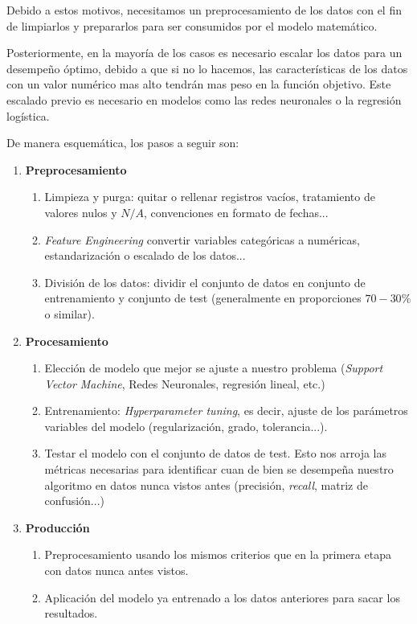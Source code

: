 Debido a estos motivos, necesitamos un preprocesamiento de los datos con el fin de limpiarlos y 
prepararlos para ser consumidos por el modelo matemático.

Posteriormente, en la mayoría de los casos es necesario escalar los datos para un desempeño óptimo, 
debido a que si no lo hacemos, las características de los datos con un valor numérico mas alto 
tendrán mas peso en la función objetivo. Este escalado previo es necesario en modelos como 
las redes neuronales o la regresión logística.

\clearpage

\noindent De manera esquemática, los pasos a seguir son:
\begin{framed}
\begin{enumerate}
  \item \textbf{Preprocesamiento}
  \begin{enumerate}
    \item Limpieza y purga: quitar o rellenar registros vacíos, tratamiento de valores nulos 
          y $N/A$, convenciones en formato de fechas...
    \item \textit{Feature Engineering} convertir variables categóricas a numéricas, 
          estandarización o escalado de los datos...
    \item División de los datos: dividir el conjunto de datos en conjunto de entrenamiento y 
          conjunto de test (generalmente en proporciones $70 - 30\%$ o similar).
  \end{enumerate}
  
  \item \textbf{Procesamiento}
  \begin{enumerate}
    \item Elección de modelo que mejor se ajuste a nuestro problema 
          (\textit{Support Vector Machine}, Redes Neuronales, regresión lineal, etc.)
    \item Entrenamiento: \textit{Hyperparameter tuning}, 
          es decir, ajuste de los parámetros variables del modelo (regularización, grado, tolerancia...).
    \item Testar el modelo con el conjunto de datos de test. Esto nos arroja las métricas necesarias
    para identificar cuan de bien se desempeña nuestro algoritmo en datos nunca vistos antes 
    (precisión, \textit{recall}, matriz de confusión...)
  \end{enumerate}
  
  \item \textbf{Producción}
  \begin{enumerate}
    \item Preprocesamiento usando los mismos criterios que en la primera etapa con datos nunca 
          antes vistos.
    \item Aplicación del modelo ya entrenado a los datos anteriores para sacar los resultados.
  \end{enumerate}
\end{enumerate}
\end{framed}

